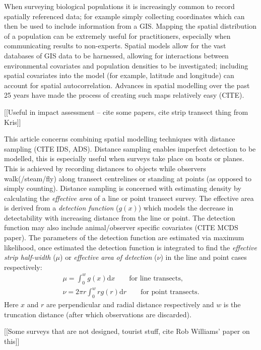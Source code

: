 \documentclass[useAMS,referee]{biom}
\begin{document}
When surveying biological populations it is increasingly common to record spatially referenced data; for example simply collecting coordinates which can then be used to include information from a GIS. Mapping the spatial distribution of a population can be extremely useful for practitioners, especially when communicating results to non-experts. Spatial models allow for the vast databases of GIS data to be harnessed, allowing for interactions between environmental covariates and population densities to be investigated; including spatial covariates into the model (for example, latitude and longitude) can account for spatial autocorrelation. Advances in spatial modelling over the past 25 years have made the process of creating such maps relatively easy (CITE). 

[[Useful in impact assessment -- cite some papers, cite strip transect thing from Kris]]

This article concerns combining spatial modelling techniques with distance sampling (CITE IDS, ADS). Distance sampling enables imperfect detection to be modelled, this is especially useful when surveys take place on boats or planes. This is achieved by recording distances to objects while observers walk(/steam/fly) along transect centrelines or standing at points (as opposed to simply counting). Distance sampling is concerned with estimating density by calculating the \textit{effective area} of a line or point transect survey. The effective area is derived from a \textit{detection function} ($g(x)$) which models the decrease in detectability with increasing distance from the line or point. The detection function may also include animal/observer specific covariates (CITE MCDS paper). The parameters of the detection function are estimated via maximum likelihood, once estimated the detection function is integrated to find the \textit{effective strip half-width} ($\mu$) or \textit{effective area of detection} ($\nu$) in the line and point cases respectively:
\begin{eqnarray*}
\mu = \int_0^w g(x) \text{d}x \qquad \text{for line transects},\\
\nu = 2\pi r \int_0^w r g(r) \text{d}r \qquad \text{for point transects}.
\end{eqnarray*}
Here $x$ and $r$ are perpendicular and radial distance respectively and $w$ is the truncation distance (after which observations are discarded).



[[Some surveys that are not designed, tourist stuff, cite Rob Williams' paper on this]]
\end{document}
